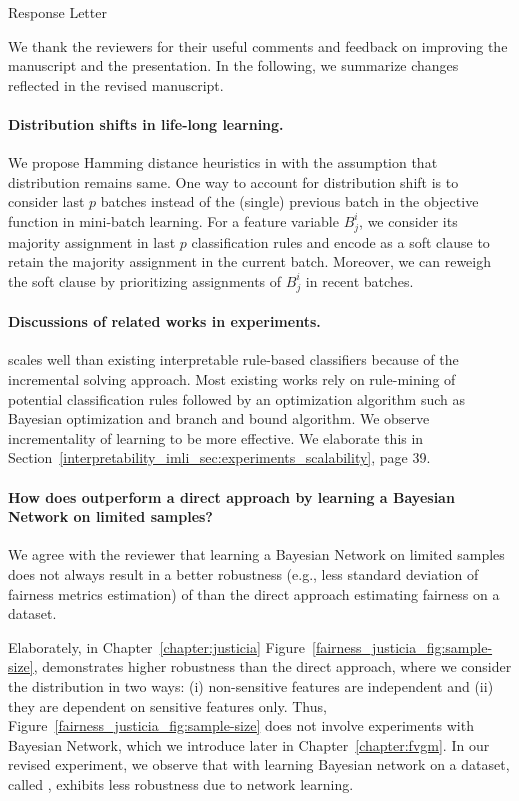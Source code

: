 \begin{center}
	\large
	Response Letter
\end{center}
We thank the reviewers for their useful comments and feedback on improving the manuscript and the presentation. In the following, we summarize changes reflected in the revised manuscript.


\paragraph{Distribution shifts in life-long learning.} We propose Hamming distance heuristics in {\imli} with the assumption that distribution remains same. One way to account for distribution shift is to consider last $ p $ batches instead of the (single) previous batch in the objective function in mini-batch learning. For a feature variable $ B^i_j $, we consider its majority assignment in last $ p $ classification rules and encode as a soft clause to retain the majority assignment in the current batch. Moreover, we can reweigh the soft clause by prioritizing assignments of $ B^i_j $ in recent batches.

\paragraph{Discussions of related works in experiments.}{\imli} scales well than existing interpretable rule-based classifiers because of the incremental solving approach. Most existing works rely on rule-mining of potential classification rules followed by an optimization algorithm such as Bayesian optimization and branch and bound algorithm. We observe incrementality of learning to be more effective. We elaborate this in Section~\ref{interpretability_imli_sec:experiments_scalability}, page 39.


\paragraph{How does {\justicia} outperform a direct approach by learning a Bayesian Network on limited samples?} We agree with the reviewer that learning a Bayesian Network on limited samples does not always result in a better robustness (e.g., less standard deviation of fairness metrics estimation) of {\justicia} than the direct approach estimating fairness on a dataset. 

Elaborately, in Chapter~\ref{chapter:justicia} Figure~\ref{fairness_justicia_fig:sample-size}, {\justicia} demonstrates higher robustness than the direct approach, where we consider the distribution in two ways: (i) non-sensitive features are independent and (ii) they are dependent on sensitive features only. Thus, Figure~\ref{fairness_justicia_fig:sample-size} does not involve experiments with Bayesian Network, which we introduce later in Chapter~\ref{chapter:fvgm}. In our revised experiment, we observe that {\justicia} with learning Bayesian network on a dataset, called {\fvgm}, exhibits less robustness due to network learning.


